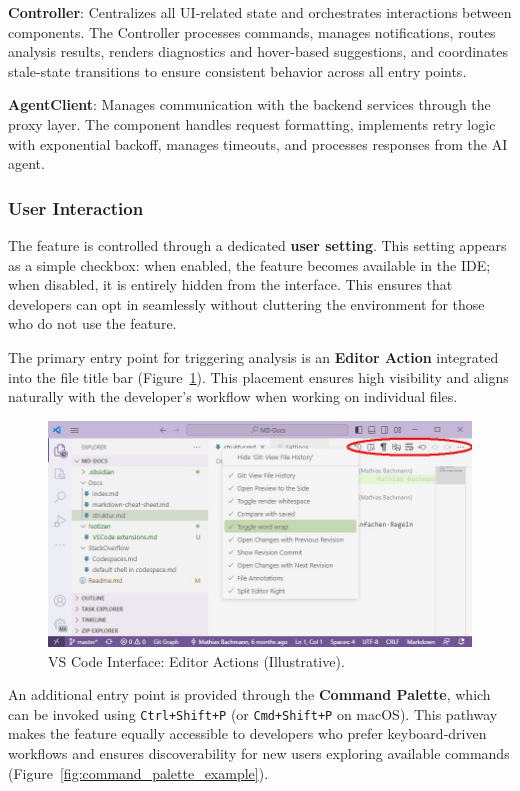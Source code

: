 \begin{spacing}{1.2}
\textbf{Controller}: Centralizes all UI-related state and orchestrates interactions between components. The Controller processes commands, manages notifications, routes analysis results, renders diagnostics and hover-based suggestions, and coordinates stale-state transitions to ensure consistent behavior across all entry points.

\textbf{AgentClient}: Manages communication with the backend services through the proxy layer. The component handles request formatting, implements retry logic with exponential backoff, manages timeouts, and processes responses from the AI agent.

\subsubsection{User Interaction}
The feature is controlled through a dedicated \textbf{user setting}. This setting appears as a simple checkbox: when enabled, the feature becomes available in the IDE; when disabled, it is entirely hidden from the interface. This ensures that developers can opt in seamlessly without cluttering the environment for those who do not use the feature.

The primary entry point for triggering analysis is an \textbf{Editor Action} integrated into the file title bar (Figure~\ref{fig:editor_action_implementation}). This placement ensures high visibility and aligns naturally with the developer’s workflow when working on individual files.

\begin{figure}[H]
    \centering
    \includegraphics[scale=0.4]{Images/editor_actions.jpg}
    \caption{VS Code Interface: Editor Actions (Illustrative).}
    \label{fig:editor_action_implementation}
\end{figure}

An additional entry point is provided through the \textbf{Command Palette}, which can be invoked using \texttt{Ctrl+Shift+P} (or \texttt{Cmd+Shift+P} on macOS). This pathway makes the feature equally accessible to developers who prefer keyboard-driven workflows and ensures discoverability for new users exploring available commands (Figure~\ref{fig:command_palette_example}).


\end{spacing}
